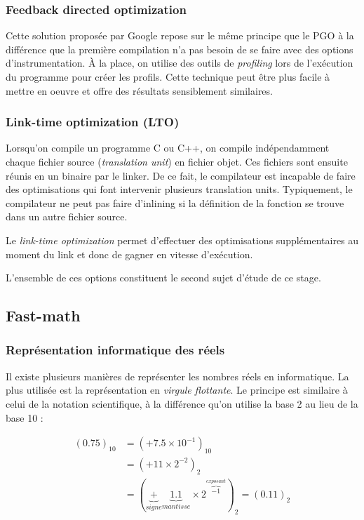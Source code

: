 \documentclass[a4paper,11pt]{report}
\begin{document}
\subsubsection{Feedback directed optimization}
Cette solution proposée par Google \cite{45290} repose sur le même principe que le PGO à la différence que la première compilation n'a pas besoin de se faire avec des options d'instrumentation.
À la place, on utilise des outils de \emph{profiling} lors de l'exécution du programme pour créer les profils.
Cette technique peut être plus facile à mettre en oeuvre et offre des résultats sensiblement similaires.

\subsubsection{Link-time optimization (LTO)}
Lorsqu'on compile un programme C ou C++, on compile indépendamment chaque fichier source (\emph{translation unit}) en fichier objet.
Ces fichiers sont ensuite réunis en un binaire par le linker.
De ce fait, le compilateur est incapable de faire des optimisations qui font intervenir plusieurs translation units.
Typiquement, le compilateur ne peut pas faire d'inlining si la définition de la fonction se trouve dans un autre fichier source.

Le \emph{link-time optimization} permet d'effectuer des optimisations supplémentaires au moment du link et donc de gagner en vitesse d'exécution.

\bigskip
L'ensemble de ces options constituent le second sujet d'étude de ce stage.

\subsection{Fast-math}\label{section:fast-math}
\subsubsection{Représentation informatique des réels}
Il existe plusieurs manières de représenter les nombres réels en informatique.
La plus utilisée est la représentation en \emph{virgule flottante}.
Le principe est similaire à celui de la notation scientifique, à la différence qu'on utilise la base 2 au lieu de la base 10 :

\begin{displaymath}
    \begin{split}
        (0.75)_{10} & = (+ 7.5 \times 10^{-1})_{10} \\
        & = (+11 \times 2^{-2})_{2} \\
        & = (\underbrace{+}_{signe} \underbrace{1.1}_{mantisse} \times 2^{\overbrace{-1}^{exposant}})_{2} = (0.11)_{2}
    \end{split}
\end{displaymath}
\end{document}
